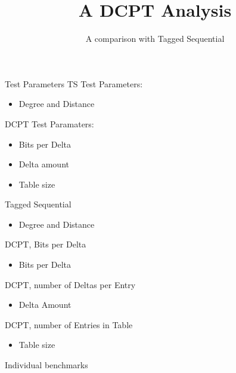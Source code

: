 \documentclass{beamer}
\title{A DCPT Analysis}
\subtitle{A comparison with Tagged Sequential}
\begin{document}
\maketitle

\begin{frame}{Test Parameters}
	TS Test Parameters:
	\begin{itemize}
		\item Degree and Distance
	\end{itemize}
	DCPT Test Paramaters:
	\begin{itemize}
		\item Bits per Delta
		\item Delta amount
		\item Table size
	\end{itemize}
\end{frame}

\begin{frame}{Tagged Sequential}
	\begin{itemize}
		\item Degree and Distance
	\end{itemize}
	
\end{frame}

\begin{frame}{DCPT, Bits per Delta}
	\begin{itemize}
		\item Bits per Delta
	\end{itemize}
	
\end{frame}

\begin{frame}{DCPT, number of Deltas per Entry}
	\begin{itemize}
		\item Delta Amount
	\end{itemize}
	
\end{frame}

\begin{frame}{DCPT, number of Entries in Table}
	\begin{itemize}
		\item Table size
	\end{itemize}
	
\end{frame}

\begin{frame}{Individual benchmarks}
	
\end{frame}
\end{document}
